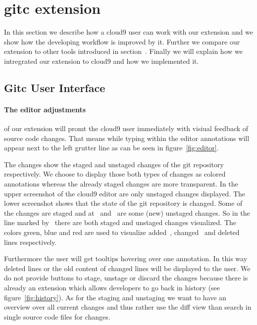\section{gitc extension}
\label{sec:Extension}
In this section we describe how a cloud9 user can work with our extension and we show how the developing workflow is improved by it.
Further we compare our extension to other tools introduced in section~.
Finally we will explain how we intregrated our extension to cloud9 and how we implemented it.

\subsection{Gitc User Interface}
\label{sec:gitc_ui}
\paragraph{The editor adjustments} of our extension will promt the cloud9 user immediately with visiual feedback of source code changes.
That means while typing within the editor annotations will appear next to the left grutter line as can be seen in figure~\ref{fig:editor}.

The changes show the staged and unstaged changes of the git repository respectively.
We choose to display those both types of changes as colored annotations whereas the already staged changes are more transparent.
In the upper screenshot of the cloud9 editor are only unstaged changes displayed.
The lower screenshot shows that the state of the git repository is changed.
Some of the changes are staged and at~ and~ are some (new) unstaged changes.
So in the line marked by~ there are both staged and unstaged changes visualized.
The colors green, blue and red are used to visualize added~, changed~ and deleted~ lines respectively.

Furthermore the user will get tooltips hovering over one annotation.
In this way deleted lines or the old content of changed lines will be displayed to the user.
We do not provide buttons to stage, unstage or discard the changes because there is already an extension which allows developers to go back in history (see figure~\ref{fig:history}).
As for the staging and unstaging we want to have an overview over all current changes and thus rather use the diff view than search in single source code files for changes.

